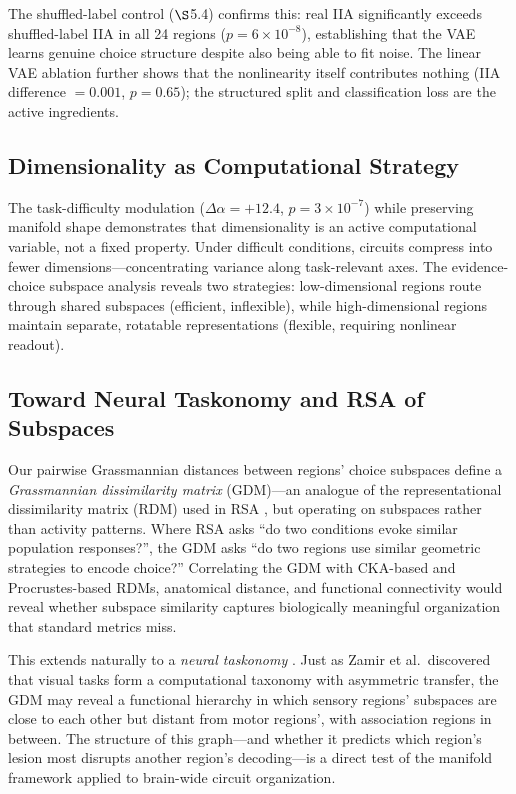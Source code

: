 \documentclass{article}
\begin{document}
The shuffled-label control ($\S$5.4) confirms this: real IIA significantly exceeds shuffled-label IIA in all 24 regions ($p = 6 \times 10^{-8}$), establishing that the VAE learns genuine choice structure despite also being able to fit noise. The linear VAE ablation further shows that the nonlinearity itself contributes nothing (IIA difference $= 0.001$, $p = 0.65$); the structured split and classification loss are the active ingredients.

\subsection{Dimensionality as Computational Strategy}

The task-difficulty modulation ($\Delta\alpha = +12.4$, $p = 3 \times 10^{-7}$) while preserving manifold shape demonstrates that dimensionality is an active computational variable, not a fixed property. Under difficult conditions, circuits compress into fewer dimensions---concentrating variance along task-relevant axes. The evidence-choice subspace analysis reveals two strategies: low-dimensional regions route through shared subspaces (efficient, inflexible), while high-dimensional regions maintain separate, rotatable representations (flexible, requiring nonlinear readout).

\subsection{Toward Neural Taskonomy and RSA of Subspaces}

Our pairwise Grassmannian distances between regions' choice subspaces define a \emph{Grassmannian dissimilarity matrix} (GDM)---an analogue of the representational dissimilarity matrix (RDM) used in RSA \citep{kriegeskorte2008representational}, but operating on subspaces rather than activity patterns. Where RSA asks ``do two conditions evoke similar population responses?'', the GDM asks ``do two regions use similar geometric strategies to encode choice?'' Correlating the GDM with CKA-based and Procrustes-based RDMs, anatomical distance, and functional connectivity would reveal whether subspace similarity captures biologically meaningful organization that standard metrics miss.

This extends naturally to a \emph{neural taskonomy} \citep{zamir2018taskonomy}. Just as Zamir et al.\ discovered that visual tasks form a computational taxonomy with asymmetric transfer, the GDM may reveal a functional hierarchy in which sensory regions' subspaces are close to each other but distant from motor regions', with association regions in between. The structure of this graph---and whether it predicts which region's lesion most disrupts another region's decoding---is a direct test of the manifold framework applied to brain-wide circuit organization.
\end{document}

